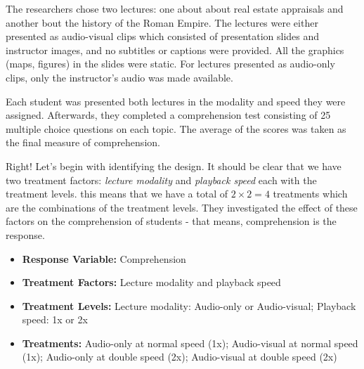\documentclass[
  letterpaper,
]{book}
\providecommand{\tightlist}{%
  \setlength{\itemsep}{0pt}\setlength{\parskip}{0pt}}\usepackage{longtable,booktabs,array}
\begin{document}
\begin{tcolorbox}
The researchers chose two lectures: one about about real estate
appraisals and another bout the history of the Roman Empire. The
lectures were either presented as audio-visual clips which consisted of
presentation slides and instructor images, and no subtitles or captions
were provided. All the graphics (maps, figures) in the slides were
static. For lectures presented as audio-only clips, only the
instructor's audio was made available.

Each student was presented both lectures in the modality and speed they
were assigned. Afterwards, they completed a comprehension test
consisting of 25 multiple choice questions on each topic. The average of
the scores was taken as the final measure of comprehension.

\end{tcolorbox}


Right! Let's begin with identifying the design. It should be clear that
we have two treatment factors: \emph{lecture modality} and
\emph{playback speed} each with the treatment levels. this means that we
have a total of \(2 \times 2 = 4\) treatments which are the combinations
of the treatment levels. They investigated the effect of these factors
on the comprehension of students - that means, comprehension is the
response.

\begin{itemize}
\tightlist
\item
  \textbf{Response Variable:} Comprehension\\
\item
  \textbf{Treatment Factors:} Lecture modality and playback speed\\
\item
  \textbf{Treatment Levels:} Lecture modality: Audio-only or
  Audio-visual; Playback speed: 1x or 2x\\
\item
  \textbf{Treatments:} Audio-only at normal speed (1x); Audio-visual at
  normal speed (1x); Audio-only at double speed (2x); Audio-visual at
  double speed (2x)
\end{itemize}
\end{document}
